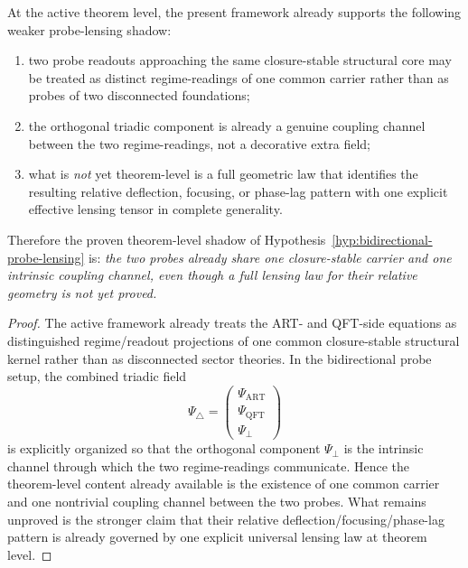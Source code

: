 \begin{theorem}
\label{thm:theorem-level-shadow-bidirectional-probe-lensing}
At the active theorem level, the present framework already supports the following weaker probe-lensing shadow:
\begin{enumerate}[leftmargin=2em,label=(\roman*)]
  \item two probe readouts approaching the same closure-stable structural core may be treated as distinct regime-readings of one common carrier rather than as probes of two disconnected foundations;
  \item the orthogonal triadic component is already a genuine coupling channel between the two regime-readings, not a decorative extra field;
  \item what is \emph{not} yet theorem-level is a full geometric law that identifies the resulting relative deflection, focusing, or phase-lag pattern with one explicit effective lensing tensor in complete generality.
\end{enumerate}
Therefore the proven theorem-level shadow of Hypothesis~\ref{hyp:bidirectional-probe-lensing} is:
\emph{the two probes already share one closure-stable carrier and one intrinsic coupling channel, even though a full lensing law for their relative geometry is not yet proved.}
\end{theorem}

\begin{proof}
The active framework already treats the ART- and QFT-side equations as distinguished regime/readout projections of one common closure-stable structural kernel rather than as disconnected sector theories. In the bidirectional probe setup, the combined triadic field
\[
  \Psi_{\triangle}
  =
  \begin{pmatrix}
    \Psi_{\mathrm{ART}}\\
    \Psi_{\mathrm{QFT}}\\
    \Psi_\perp
  \end{pmatrix}
\]
is explicitly organized so that the orthogonal component $\Psi_\perp$ is the intrinsic channel through which the two regime-readings communicate. Hence the theorem-level content already available is the existence of one common carrier and one nontrivial coupling channel between the two probes. What remains unproved is the stronger claim that their relative deflection/focusing/phase-lag pattern is already governed by one explicit universal lensing law at theorem level.
\end{proof}

